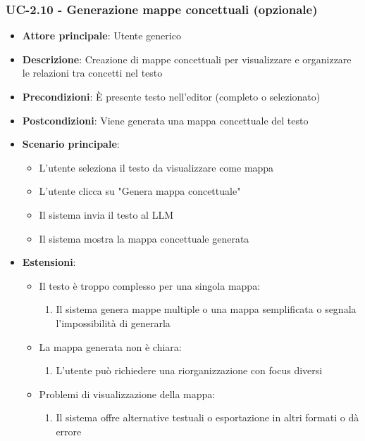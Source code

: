 \documentclass[11pt,a4paper]{article}
\begin{document}
\subsubsection{UC-2.10 - Generazione mappe concettuali (opzionale)}
\begin{itemize}
    \item \textbf{Attore principale}: Utente generico
    \item \textbf{Descrizione}: Creazione di mappe concettuali per visualizzare e organizzare le relazioni tra concetti nel testo
    \item \textbf{Precondizioni}: È presente testo nell'editor (completo o selezionato)
    \item \textbf{Postcondizioni}: Viene generata una mappa concettuale del testo
    \item \textbf{Scenario principale}:
        \begin{itemize}
            \item L'utente seleziona il testo da visualizzare come mappa
            \item L'utente clicca su "Genera mappa concettuale"
            \item Il sistema invia il testo al LLM
            \item Il sistema mostra la mappa concettuale generata
        \end{itemize}
    \item \textbf{Estensioni}:
        \begin{itemize}
            \item Il testo è troppo complesso per una singola mappa:
                \begin{enumerate}
                    \item Il sistema genera mappe multiple o una mappa semplificata o segnala l'impossibilità di generarla
                \end{enumerate}
            \item La mappa generata non è chiara:
                \begin{enumerate}
                    \item L'utente può richiedere una riorganizzazione con focus diversi
                \end{enumerate}
            \item Problemi di visualizzazione della mappa:
                \begin{enumerate}
                    \item Il sistema offre alternative testuali o esportazione in altri formati o dà errore
                \end{enumerate}
        \end{itemize}
\end{itemize}
\end{document}
